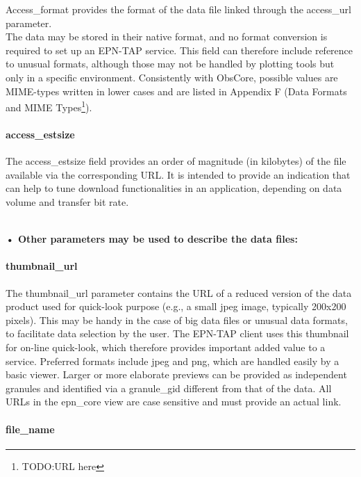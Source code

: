 \documentclass[11pt,a4paper]{ivoa}
\begin{document}
Access\_format provides the format of the data file linked through the access\_url parameter. \\ The data may be stored in their native format, and no format conversion is required to set up an EPN-TAP service. This field can therefore include reference to unusual formats, although those may not be handled by plotting tools but only in a specific environment. Consistently with ObsCore, possible values are MIME-types written in lower cases and are listed in Appendix F (Data Formats and MIME Types\footnote{TODO:URL here}).

\paragraph{access\_estsize}

The access\_estsize field provides an order of magnitude (in kilobytes) of the file available via the corresponding URL. It is intended to provide an indication that can help to tune download functionalities in an application, depending on data volume and transfer bit rate.

\\

\textbf{• Other parameters may be used to describe the data files:}

\paragraph{thumbnail\_url}

The thumbnail\_url parameter contains the URL of a reduced version of the data product used for quick-look purpose (e.g., a small jpeg image, typically 200x200 pixels). This may be handy in the case of big data files or unusual data formats, to facilitate data selection by the user. The EPN-TAP client uses this thumbnail for on-line quick-look, which therefore provides important added value to a service. Preferred formats include jpeg and png, which are handled easily by a basic viewer. Larger or more elaborate previews can be provided as independent granules and identified via a granule\_gid different from that of the data. All URLs in the epn\_core view are case sensitive and must provide an actual link.

\paragraph{file\_name}
\end{document}
